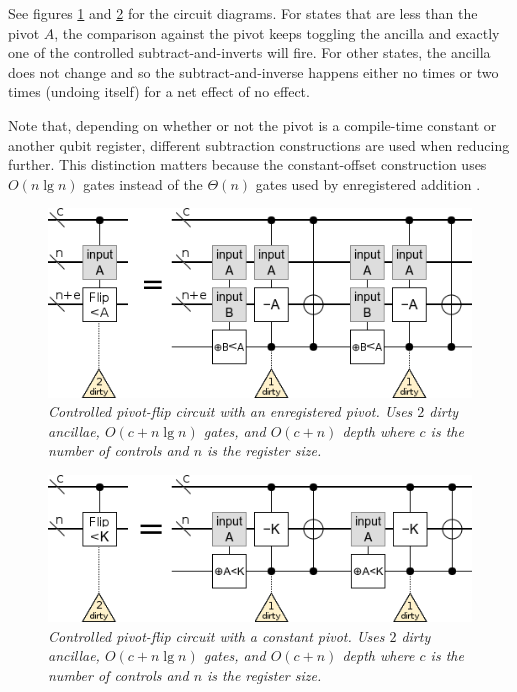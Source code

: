 \documentclass[twocolumn]{article}
\begin{document}
See figures \ref{fig:controlled-pivot-flip} and \ref{fig:controlled-const-pivot-flip} for the circuit diagrams.
For states that are less than the pivot $A$, the comparison against the pivot keeps toggling the ancilla and exactly one of the controlled subtract-and-inverts will fire.
For other states, the ancilla does not change and so the subtract-and-inverse happens either no times or two times (undoing itself) for a net effect of no effect.

Note that, depending on whether or not the pivot is a compile-time constant or another qubit register, different subtraction constructions are used when reducing further.
This distinction matters because the constant-offset construction uses $O(n \lg n)$ gates \cite{haner2016} instead of the $\Theta(n)$ gates used by enregistered addition \cite{takahashi2005}.

\begin{figure}
  \centering
  \includegraphics[width=\linewidth]{assets/controlled-pivot-flip.png}
  \caption{\em
    Controlled pivot-flip circuit with an enregistered pivot.
    Uses $2$ dirty ancillae, $O(c + n \lg n)$ gates, and $O(c + n)$ depth where $c$ is the number of controls and $n$ is the register size.
  }
  \label{fig:controlled-pivot-flip}
\end{figure}

\begin{figure}
  \centering
  \includegraphics[width=\linewidth]{assets/controlled-const-pivot-flip.png}
  \caption{\em
    Controlled pivot-flip circuit with a constant pivot.
    Uses $2$ dirty ancillae, $O(c + n \lg n)$ gates, and $O(c + n)$ depth where $c$ is the number of controls and $n$ is the register size.
  }
  \label{fig:controlled-const-pivot-flip}
\end{figure}
\end{document}
